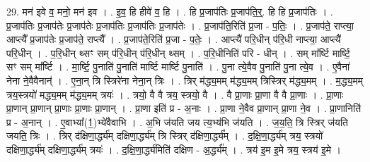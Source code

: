 \documentclass[17pt]{extarticle}
\begin{document}
29. मन॑ इवे व॒ मनो॒ मन॑ इव । . इ॒व॒ हि हीवे॑ व॒ हि । . हि प्र॒जाप॑तिः प्र॒जाप॑ति॒र्॒. हि हि प्र॒जाप॑तिः । . प्र॒जाप॑तिः प्र॒जाप॑तेः प्र॒जाप॑तेः प्र॒जाप॑तिः प्र॒जाप॑तिः प्र॒जाप॑तेः । . प्र॒जाप॑ति॒रिति॑ प्र॒जा - प॒तिः॒ । . प्र॒जाप॑ते॒ राप्त्या॒ आप्त्यै᳚ प्र॒जाप॑तेः प्र॒जाप॑ते॒ राप्त्यै᳚ । . प्र॒जाप॑ते॒रिति॑ प्र॒जा - प॒तेः॒ । . आप्त्यै॑ परि॒धीन् प॑रि॒धी नाप्त्या॒ आप्त्यै॑ परि॒धीन् । . प॒रि॒धीन् थ्सꣳ सम् प॑रि॒धीन् प॑रि॒धीन् थ्सम् । . प॒रि॒धीनिति॑ परि - धीन् । . सम् मा᳚र्ष्टि मार्ष्टि॒ सꣳ सम् मा᳚र्ष्टि । . मा॒र्ष्टि॒ पु॒नाति॑ पु॒नाति॑ मार्ष्टि मार्ष्टि पु॒नाति॑ । . पु॒ना त्ये॒वैव पु॒नाति॑ पु॒ना त्ये॒व । . ए॒वैना॑ नेना ने॒वैवैनान्॑ । . ए॒ना॒न् त्रि स्त्रिरे॑ना नेना॒न् त्रिः । . त्रिर् म॑द्ध्य॒मम् म॑द्ध्य॒मम् त्रिस्त्रिर् म॑द्ध्य॒मम् । . म॒द्ध्य॒मम् त्रय॒स्त्रयो॑ मद्ध्य॒मम् म॑द्ध्य॒मम् त्रयः॑ । . त्रयो॒ वै वै त्रय॒ स्त्रयो॒ वै । . वै प्रा॒णाः प्रा॒णा वै वै प्रा॒णाः । . प्रा॒णाः प्रा॒णान् प्रा॒णान् प्रा॒णाः प्रा॒णाः प्रा॒णान् । . प्रा॒णा इति॑ प्र - अ॒नाः । . प्रा॒णा ने॒वैव प्रा॒णान् प्रा॒णा ने॒व । . प्रा॒णानिति॑ प्र - अ॒नान् । . ए॒वाभ्या᳚(1॒)भ्ये॑वैवाभि । . अ॒भि ज॑यति जय त्य॒भ्य॑भि ज॑यति । . ज॒य॒ति॒ त्रि स्त्रिर् ज॑यति जयति॒ त्रिः । . त्रिर् द॑क्षिणा॒र्द्ध्य॑म् दक्षिणा॒र्द्ध्य॑म् त्रि स्त्रिर् द॑क्षिणा॒र्द्ध्य᳚म् । . द॒क्षि॒णा॒र्द्ध्य॑म् त्रय॒ स्त्रयो॑ दक्षिणा॒र्द्ध्य॑म् दक्षिणा॒र्द्ध्य॑म् त्रयः॑ । . द॒क्षि॒णा॒र्द्ध्य॑मिति॑ दक्षिण - अ॒र्द्ध्य᳚म् । . त्रय॑ इ॒म इ॒मे त्रय॒ स्त्रय॑ इ॒मे । \newline
\end{document}
